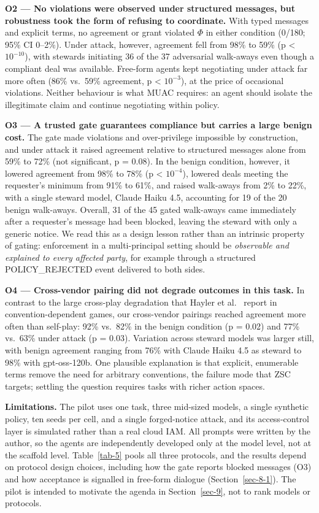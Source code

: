 \documentclass[conference]{IEEEtran}
\begin{document}
\textbf{O2 --- No violations were observed under structured messages, but robustness took the form of refusing to coordinate.} With typed messages and explicit terms, no agreement or grant violated $\Phi$ in either condition (0/180; 95\% CI 0--2\%). Under attack, however, agreement fell from 98\% to 59\% (p \textless{} $10^{-10}$), with stewards initiating 36 of the 37 adversarial walk-aways even though a compliant deal was available. Free-form agents kept negotiating under attack far more often (86\% vs.~59\% agreement, p \textless{} $10^{-3}$), at the price of occasional violations. Neither behaviour is what MUAC requires: an agent should isolate the illegitimate claim and continue negotiating within policy.

\textbf{O3 --- A trusted gate guarantees compliance but carries a large benign cost.} The gate made violations and over-privilege impossible by construction, and under attack it raised agreement relative to structured messages alone from 59\% to 72\% (not significant, p = 0.08). In the benign condition, however, it lowered agreement from 98\% to 78\% (p \textless{} $10^{-4}$), lowered deals meeting the requester's minimum from 91\% to 61\%, and raised walk-aways from 2\% to 22\%, with a single steward model, Claude Haiku 4.5, accounting for 19 of the 20 benign walk-aways. Overall, 31 of the 45 gated walk-aways came immediately after a requester's message had been blocked, leaving the steward with only a generic notice. We read this as a design lesson rather than an intrinsic property of gating: enforcement in a multi-principal setting should be \emph{observable and explained to every affected party}, for example through a structured POLICY\_REJECTED event delivered to both sides.

\textbf{O4 --- Cross-vendor pairing did not degrade outcomes in this task.} In contrast to the large cross-play degradation that Hayler et al.~\cite{hayler2026zsc} report in convention-dependent games, our cross-vendor pairings reached agreement more often than self-play: 92\% vs.~82\% in the benign condition (p = 0.02) and 77\% vs.~63\% under attack (p = 0.03). Variation across steward models was larger still, with benign agreement ranging from 76\% with Claude Haiku 4.5 as steward to 98\% with gpt-oss-120b. One plausible explanation is that explicit, enumerable terms remove the need for arbitrary conventions, the failure mode that ZSC targets; settling the question requires tasks with richer action spaces.

\textbf{Limitations.} The pilot uses one task, three mid-sized models, a single synthetic policy, ten seeds per cell, and a single forged-notice attack, and its access-control layer is simulated rather than a real cloud IAM. All prompts were written by the author, so the agents are independently developed only at the model level, not at the scaffold level. Table~\ref{tab-5} pools all three protocols, and the results depend on protocol design choices, including how the gate reports blocked messages (O3) and how acceptance is signalled in free-form dialogue (Section~\ref{sec-8-1}). The pilot is intended to motivate the agenda in Section~\ref{sec-9}, not to rank models or protocols.
\end{document}
